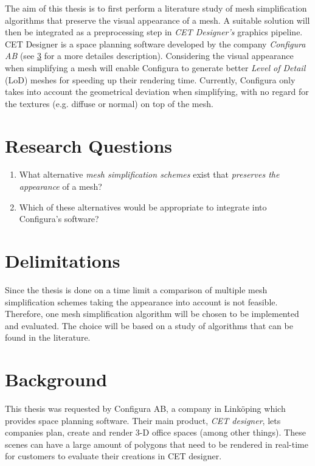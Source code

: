 The aim of this thesis is to first perform a literature study of mesh simplification algorithms that preserve the visual appearance of a mesh. A suitable solution will then be integrated as a preprocessing step in \emph{CET Designer's} graphics pipeline. CET Designer is a space planning software developed by the company \emph{Configura AB} (see \cref{sec:background} for a more detailes description). Considering the visual appearance when simplifying a mesh will enable Configura to generate better \emph{Level of Detail} (LoD) meshes for speeding up their rendering time. Currently, Configura only takes into account the geometrical deviation when simplifying, with no regard for the textures (e.g. diffuse or normal) on top of the mesh.


\section{Research Questions}
\label{sec:research-questions}


\begin{enumerate}
\item What alternative \emph{mesh simplification schemes} exist that \emph{preserves the appearance} of a mesh? 
\item Which of these alternatives would be appropriate to integrate into Configura's software?

\end{enumerate}


\section{Delimitations}
\label{sec:delimitations}
Since the thesis is done on a time limit a comparison of multiple mesh simplification schemes taking the appearance into account is not feasible. Therefore, one mesh simplification algorithm will be chosen to be implemented and evaluated. The choice will be based on a study of algorithms that can be found in the literature.

\section{Background}
\label{sec:background}

This thesis was requested by Configura AB, a company in Linköping which provides space planning software. Their main product, \emph{CET designer}, lets companies plan, create and render 3-D office spaces (among other things). These scenes can have a large amount of polygons that need to be rendered in real-time for customers to evaluate their creations in CET designer.

